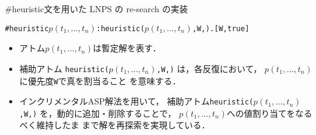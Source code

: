 \documentclass[11pt,dvipdfmx]{beamer}
\begin{document}
\begin{frame}{\textsf{\#heuristic}文を用いた LNPS の re-search の実装}

\begin{exampleblock}{}\small
\begin{alltt}
  \#heuristic \alert{\(p(t_{1},\ldots,t_{n})\)} : heuristic(\alert{\(p(t_{1},\ldots,t_{n})\)},W,). [W,true]
\end{alltt}
\end{exampleblock}
\vfill 
\begin{itemize}
  \item アトム\alert{$p(t_{1},\ldots,t_{n})$}は暫定解を表す．
  \item 補助アトム
    {\tt heuristic(\alert{\(p(t_{1},\ldots,t_{n})\)},W,)}
    は，各反復において，
    \alert{$p(t_{1},\ldots,t_{n})$}に優先度\texttt{W}で真を割当ること
    を意味する．
  \item インクリメンタルASP解法を用いて，
    補助アトム{\tt heuristic(\alert{\(p(t_{1},\ldots,t_{n})\)},W,)}
    を，動的に追加・削除することで，
    \alert{$p(t_{1},\ldots,t_{n})$}への値割り当てをなるべく維持したま
    まで解を再探索を実現している．
\end{itemize}


\end{frame}
\end{document}
